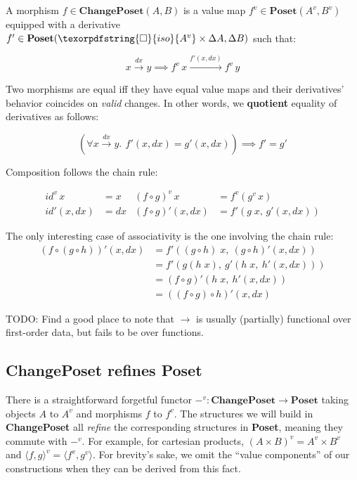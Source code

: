 \documentclass{rntz}
\newcommand\todo[1]{{\color{Rhodamine}#1}}
\newcommand\cat\textbf
\newcommand\strong\textbf
\newcommand\CP{\cat{ChangePoset}}
\newcommand\Poset{\cat{Poset}}
\newcommand\D\Delta
\newcommand\x\times
\newcommand\iso{\texorpdfstring{\ensuremath{\square}}{iso}}
\newcommand\isof[1]{\iso {#1}}
\newcommand\fname[1]{\textit{#1}}
\newcommand\id{\fname{id}}
\newcommand\validarrow{{\to}}
\newcommand\longvalidarrow{{\longrightarrow}}
\newcommand\valid[1]{\mathrel{\overset{#1}{\validarrow}}}
\newcommand\longvalid[1]{\mathrel{\overset{#1}{\longvalidarrow}}}
\newcommand\vals[1]{#1^v} %
\newcommand\chgs[1]{\D{#1}}
\newcommand\fork[1]{\langle{#1}\rangle}
\newcommand\funct[1]{\vals{#1}}
\newcommand\deriv[1]{#1'}
\newcommand\bindsp{~\,}
\newcommand\fa[1]{\forall #1.\bindsp}
\begin{document}
\noindent
A morphism $f \in \CP(A, B)$ is a value map $\funct f \in \Poset(\vals A,
\vals B)$ equipped with a derivative $\deriv f \in \Poset(\isof{\vals A} \x
\chgs A, \chgs B)$ such that:

\[x \valid{dx} y \implies \funct f\,x \longvalid{\deriv f(x,dx)} \funct f\,y\]

\noindent
Two morphisms are equal iff they have equal value maps and their derivatives'
behavior coincides on \emph{valid} changes. In other words, we \strong{quotient}
equality of derivatives as follows:

\[ (\fa{x \valid{dx} y} f'(x,dx) = g'(x,dx)) \implies f' = g' \]

\noindent
Composition follows the chain rule:

\begin{align*}
  \funct\id\, x &= x &
  \funct{(f \circ g)}\, x &= \funct f (\funct g\,x)\\
  \deriv\id(x,dx) &= dx
  & \deriv{(f \circ g)} (x,dx) &= \deriv f (g \;x,\, \deriv g(x,dx))
\end{align*}

\noindent The only interesting case of associativity is the one involving the
chain rule:
\begin{align*}
  \deriv{(f \circ (g \circ h))} (x,dx)
  &= \deriv f((g \circ h) \;x,\ \deriv{(g \circ h)}(x,dx))\\
  &= \deriv f (g(h \;x),\ \deriv g(h \;x,\ \deriv h(x,dx)))\\
  &= \deriv{(f \circ g)} (h \;x,\ \deriv h(x,dx))\\
  &= \deriv{((f \circ g) \circ h)} (x,dx)
\end{align*}

\todo{TODO: Find a good place to note that $\validarrow$ is usually (partially)
  functional over first-order data, but fails to be over functions.}


\subsection{\CP{} refines \Poset{}}
\label{sec:refines}

There is a straightforward forgetful functor $\vals{-} : \CP \to \Poset$ taking
objects $A$ to $\vals{A}$ and morphisms $f$ to $\funct f$. The structures we
will build in \CP{} all \emph{refine} the corresponding structures in \Poset{},
meaning they commute with $\vals{-}$. For example, for cartesian products,
$\vals{(A \x B)} = \vals{A} \x \vals{B}$ and $\funct{\fork{f,g}} = \fork{\funct
  f, \funct g}$. For brevity's sake, we omit the ``value components'' of our
constructions when they can be derived from this fact.
\end{document}
